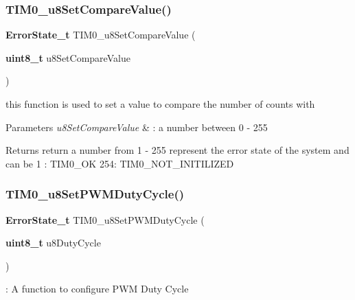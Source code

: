 \subsubsection{T\+I\+M0\+\_\+u8\+Set\+Compare\+Value()}
{\footnotesize\ttfamily \textbf{ Error\+State\+\_\+t} T\+I\+M0\+\_\+u8\+Set\+Compare\+Value (\begin{DoxyParamCaption}\item[{\textbf{ uint8\+\_\+t}}]{u8\+Set\+Compare\+Value }\end{DoxyParamCaption})}



this function is used to set a value to compare the number of counts with 


\begin{DoxyParams}{Parameters}
{\em u8\+Set\+Compare\+Value} & \+: a number between 0 -\/ 255 \\
\hline
\end{DoxyParams}
\begin{DoxyReturn}{Returns}
return a number from 1 -\/ 255 represent the error state of the system and can be 1 \+: T\+I\+M0\+\_\+\+OK 254\+: T\+I\+M0\+\_\+\+N\+O\+T\+\_\+\+I\+N\+I\+T\+I\+L\+I\+Z\+ED 
\end{DoxyReturn}
\mbox{\label{_t_i_m_e_r0__interface_8h_a7c40b4a0e508474d5068471682567f39}} 
\subsubsection{T\+I\+M0\+\_\+u8\+Set\+P\+W\+M\+Duty\+Cycle()}
{\footnotesize\ttfamily \textbf{ Error\+State\+\_\+t} T\+I\+M0\+\_\+u8\+Set\+P\+W\+M\+Duty\+Cycle (\begin{DoxyParamCaption}\item[{\textbf{ uint8\+\_\+t}}]{u8\+Duty\+Cycle }\end{DoxyParamCaption})}

\+: A function to configure P\+WM Duty Cycle \mbox{\label{_t_i_m_e_r0__interface_8h_ab588fb0557b32e1d9b4c1c075a413c37}} 
